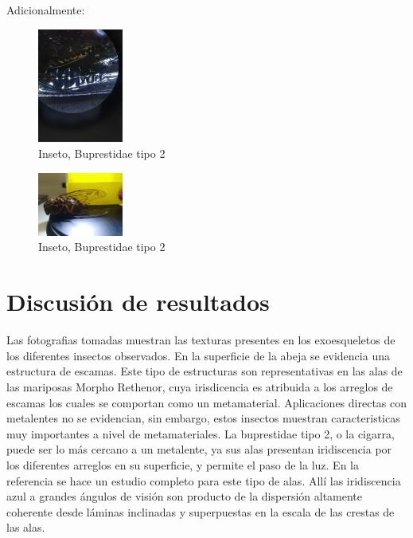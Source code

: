 \documentclass[a4paper, twocolumn, 10pt]{article}
\begin{document}
 Adicionalmente:
 
 \begin{figure}[H]
    \centering
    \includegraphics[width = 0.25\textwidth]{ala_cerca.jpg}
    \caption{Inseto, Buprestidae tipo 2}
    \label{tipos}
\end{figure}

\begin{figure}[H]
    \centering
    \includegraphics[width = 0.25\textwidth]{IMG_20190828_154520.jpg}
    \caption{Inseto, Buprestidae tipo 2}
    \label{tipos}
\end{figure}

\section*{Discusión de resultados}

Las fotografias tomadas muestran las texturas presentes en los exoesqueletos  de los diferentes insectos observados. En la superficie de la abeja se evidencia una estructura de escamas. Este tipo de estructuras son representativas en las alas de las mariposas Morpho Rethenor, cuya irisdicencia es atribuida a los arreglos de escamas los cuales se comportan como un metamaterial.  Aplicaciones directas con metalentes no se evidencian, sin embargo, estos insectos muestran caracteristicas muy importantes a nivel de metamateriales. La buprestidae tipo 2, o la cigarra, puede ser lo más cercano a un metalente, ya sus alas presentan iridiscencia por los diferentes arreglos en su superficie, y permite el paso de la luz. En la referencia \cite{dushkina2017coloration} se hace un estudio completo para este tipo de alas. Allí las iridiscencia azul a grandes ángulos de visión son producto de la dispersión altamente coherente desde láminas inclinadas y superpuestas en la escala de las crestas de las alas\cite{dushkina2017coloration}.
\end{document}

